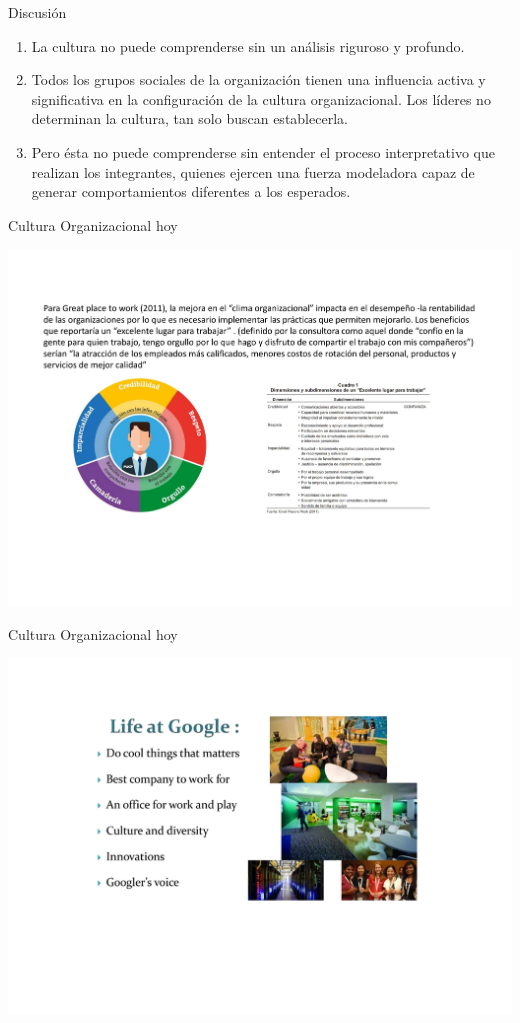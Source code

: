 \documentclass[aspectratio=169]{beamer}
\begin{document}
	\begin{frame}{Discusión}
		\begin{enumerate}
			\item La cultura no puede comprenderse sin un análisis riguroso y profundo. 
			\item Todos los grupos sociales de la organización tienen una influencia activa y significativa en la configuración de la cultura organizacional. Los líderes no determinan la cultura, tan solo buscan establecerla. 
			\item Pero ésta no puede comprenderse sin entender el proceso interpretativo que realizan los integrantes, quienes ejercen una fuerza modeladora capaz de generar comportamientos diferentes a los esperados. 
		\end{enumerate}
	\end{frame}
	\begin{frame}{Cultura Organizacional hoy}
		\begin{center}
			\includegraphics[height=\textheight]{./figures/L13.pdf}
		\end{center}
	\end{frame}
	
	\begin{frame}{Cultura Organizacional hoy}
		\begin{center}
			\includegraphics[height=\textheight]{./figures/L14.pdf}
		\end{center}
	\end{frame}
\end{document}

